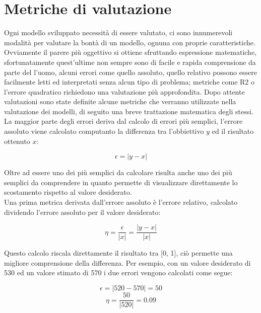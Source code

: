 \documentclass[%
    corpo=12pt,
    twoside,
    oldstyle,
    autoretitolo,
    greek,
    evenboxes,
]{toptesi}
\begin{document}
\section{Metriche di valutazione}
Ogni modello sviluppato necessità di essere valutato, ci sono innumerevoli modalità per valutare la bontà di un modello, ognuna con proprie caratteristiche. Ovviamente il parere più oggettivo si ottiene sfruttando espressione matematiche, sfortunatamente quest'ultime non sempre sono di facile e rapida comprensione da parte del l'uomo, alcuni errori come quello assoluto, quello relativo possono essere facilmente letti ed interpretati senza alcun tipo di problema; metriche come R2 o l'errore quadratico richiedono una valutazione più approfondita. Dopo attente valutazioni sono state definite alcune metriche che verranno utilizzate nella valutazione dei modelli, di seguito una breve trattazione matematica degli stessi.\\
La maggior parte degli errori deriva dal calcolo di errori più semplici, l'errore assoluto viene calcolato computanto la differenza tra l'obbiettivo $y$ ed il risultato ottenuto $x$:
\begin{center}
  \begin{equation}
    \epsilon = |y - x|
  \end{equation}
\end{center}
Oltre ad essere uno dei più semplici da calcolare risulta anche uno dei più semplici da comprendere in quanto permette di visualizzare direttamente lo scostamento rispetto al valore desiderato.\\
Una prima metrica derivata dall'errore assoluto è l'errore relativo, calcolato dividendo l'errore assoluto per il valore desiderato:
\begin{center}
  \begin{equation}
    \eta = \frac{\epsilon}{|x|} = \frac{|y - x|}{|x|}
  \end{equation}
\end{center}
Questo calcolo riscala direttamente il risultato tra [0, 1], ciò permette una migliore comprensione della differenza. Per esempio, con un valore desiderato di 530 ed un valore stimato di 570 i due errori vengono calcolati come segue:
\begin{center}
  \begin{equation}
      \epsilon = |520-570| = 50
  \end{equation}
  \begin{equation}
      \eta = \frac{50}{|520|} = 0.09
  \end{equation}
\end{center}
\end{document}
